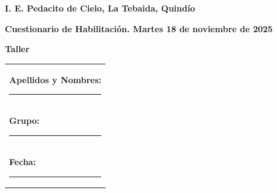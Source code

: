 \documentclass[10pt,a4paper]{article}
\makeatletter
\newcommand{\myID}{\@ID}
\makeatother
\begin{document}

\thispagestyle{empty}
{\sf
\textbf{\large{I. E. Pedacito de Cielo, La Tebaida, Quindío}}

\textbf{\large{Cuestionario de Habilitación. Martes 18 de noviembre de 2025}}

\textbf{\large{Taller \myID}}

\vspace*{2cm}

\begin{tabular}{p{14cm}}
\textbf{Apellidos y Nombres:} \hrule \\[1.5cm]
\textbf{Grupo:} \hrule \\[1.5cm]
\textbf{Fecha:} \hrule  \\[1.5cm]
\end{tabular}

\vspace*{1cm}

}
\newpage

\begin{enumerate}


\end{enumerate}
\end{document}

